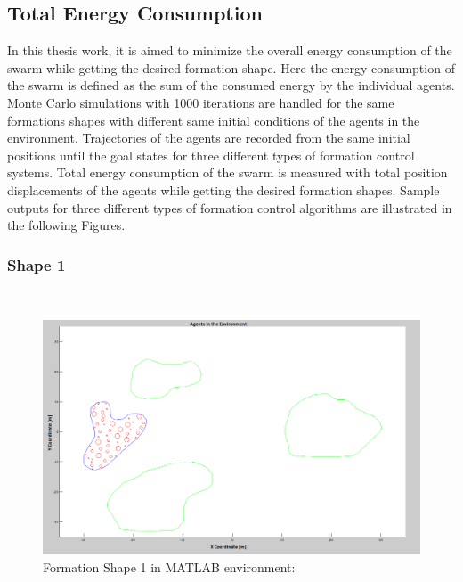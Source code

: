 \subsection{Total Energy Consumption} 
		
In this thesis work, it is aimed to minimize the overall energy consumption of the swarm while getting the desired formation shape. Here the energy consumption of the swarm is defined as the sum of the consumed energy by the individual agents. Monte Carlo simulations with 1000 iterations are handled for the same formations shapes with different same initial conditions of the agents in the environment. Trajectories of the agents are recorded from the same initial positions until the goal states for three different types of formation control systems. Total energy consumption of the swarm is measured with total position displacements of the agents while getting the desired formation shapes. Sample outputs for three different types of formation control algorithms are illustrated in the following Figures.
		
\subsubsection{Shape 1}\hspace{0pt} \\
		
\begin{figure}[H]
\caption{Formation Shape 1 in MATLAB environment:}
\centerline{\includegraphics[scale = 0.40]{Trajectories_Formation_Shape_1_2}}
\end{figure} 	
			
